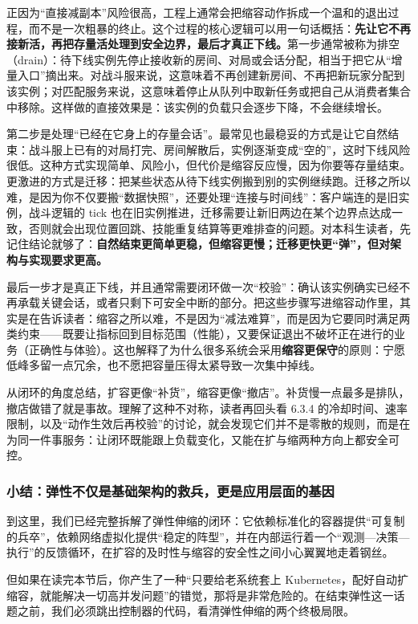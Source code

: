 正因为“直接减副本”风险很高，工程上通常会把缩容动作拆成一个温和的退出过程，而不是一次粗暴的终止。这个过程的核心逻辑可以用一句话概括：\textbf{先让它不再接新活，再把存量活处理到安全边界，最后才真正下线。}第一步通常被称为排空（drain）：待下线实例先停止接收新的房间、对局或会话分配，相当于把它从“增量入口”摘出来。对战斗服来说，这意味着不再创建新房间、不再把新玩家分配到该实例；对匹配服务来说，这意味着停止从队列中取新任务或把自己从消费者集合中移除。这样做的直接效果是：该实例的负载只会逐步下降，不会继续增长。

第二步是处理“已经在它身上的存量会话”。最常见也最稳妥的方式是让它自然结束：战斗服上已有的对局打完、房间解散后，实例逐渐变成“空的”，这时下线风险很低。这种方式实现简单、风险小，但代价是缩容反应慢，因为你要等存量结束。更激进的方式是迁移：把某些状态从待下线实例搬到别的实例继续跑。迁移之所以难，是因为你不仅要搬“数据快照”，还要处理“连接与时间线”：客户端连的是旧实例，战斗逻辑的 tick 也在旧实例推进，迁移需要让新旧两边在某个边界点达成一致，否则就会出现位置回跳、技能重复结算等更难排查的问题。对本科生读者，先记住结论就够了：\textbf{自然结束更简单更稳，但缩容更慢；迁移更快更“弹”，但对架构与实现要求更高。}

最后一步才是真正下线，并且通常需要闭环做一次“校验”：确认该实例确实已经不再承载关键会话，或者只剩下可安全中断的部分。把这些步骤写进缩容动作里，其实是在告诉读者：缩容之所以难，不是因为“减法难算”，而是因为它要同时满足两类约束——既要让指标回到目标范围（性能），又要保证退出不破坏正在进行的业务（正确性与体验）。这也解释了为什么很多系统会采用\textbf{缩容更保守}的原则：宁愿低峰多留一点冗余，也不愿把容量压得太紧导致一次集中掉线。

从闭环的角度总结，扩容更像“补货”，缩容更像“撤店”。补货慢一点最多是排队，撤店做错了就是事故。理解了这种不对称，读者再回头看 6.3.4 的冷却时间、速率限制，以及“动作生效后再校验”的讨论，就会发现它们并不是零散的规则，而是在为同一件事服务：让闭环既能跟上负载变化，又能在扩与缩两种方向上都安全可控。


\subsubsection{小结：弹性不仅是基础架构的救兵，更是应用层面的基因}

到这里，我们已经完整拆解了弹性伸缩的闭环：它依赖标准化的容器提供“可复制的兵卒”，依赖网络虚拟化提供“稳定的阵型”，并在内部运行着一个“观测—决策—执行”的反馈循环，在扩容的及时性与缩容的安全性之间小心翼翼地走着钢丝。

但如果在读完本节后，你产生了一种“只要给老系统套上 Kubernetes，配好自动扩缩容，就能解决一切高并发问题”的错觉，那将是非常危险的。在结束弹性这一话题之前，我们必须跳出控制器的代码，看清弹性伸缩的两个终极局限。

